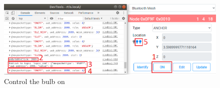 \documentclass[\main/thesis.tex]{subfiles}
\begin{document}
\begin{figure}[H]
    \centering
    \includegraphics[width=1\textwidth]{result_remote_control_on_gui.png}
    \caption{Control the bulb on}
    \label{fig:result_remote_control_on_gui}
\end{figure}


\end{document}
